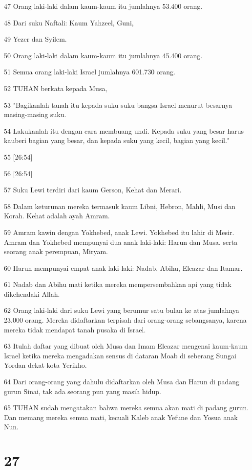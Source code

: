 \par 47 Orang laki-laki dalam kaum-kaum itu jumlahnya 53.400 orang.
\par 48 Dari suku Naftali: Kaum Yahzeel, Guni,
\par 49 Yezer dan Syilem.
\par 50 Orang laki-laki dalam kaum-kaum itu jumlahnya 45.400 orang.
\par 51 Semua orang laki-laki Israel jumlahnya 601.730 orang.
\par 52 TUHAN berkata kepada Musa,
\par 53 "Bagikanlah tanah itu kepada suku-suku bangsa Israel menurut besarnya masing-masing suku.
\par 54 Lakukanlah itu dengan cara membuang undi. Kepada suku yang besar harus kauberi bagian yang besar, dan kepada suku yang kecil, bagian yang kecil."
\par 55 [26:54]
\par 56 [26:54]
\par 57 Suku Lewi terdiri dari kaum Gerson, Kehat dan Merari.
\par 58 Dalam keturunan mereka termasuk kaum Libni, Hebron, Mahli, Musi dan Korah. Kehat adalah ayah Amram.
\par 59 Amram kawin dengan Yokhebed, anak Lewi. Yokhebed itu lahir di Mesir. Amram dan Yokhebed mempunyai dua anak laki-laki: Harun dan Musa, serta seorang anak perempuan, Miryam.
\par 60 Harun mempunyai empat anak laki-laki: Nadab, Abihu, Eleazar dan Itamar.
\par 61 Nadab dan Abihu mati ketika mereka mempersembahkan api yang tidak dikehendaki Allah.
\par 62 Orang laki-laki dari suku Lewi yang berumur satu bulan ke atas jumlahnya 23.000 orang. Mereka didaftarkan terpisah dari orang-orang sebangsanya, karena mereka tidak mendapat tanah pusaka di Israel.
\par 63 Itulah daftar yang dibuat oleh Musa dan Imam Eleazar mengenai kaum-kaum Israel ketika mereka mengadakan sensus di dataran Moab di seberang Sungai Yordan dekat kota Yerikho.
\par 64 Dari orang-orang yang dahulu didaftarkan oleh Musa dan Harun di padang gurun Sinai, tak ada seorang pun yang masih hidup.
\par 65 TUHAN sudah mengatakan bahwa mereka semua akan mati di padang gurun. Dan memang mereka semua mati, kecuali Kaleb anak Yefune dan Yosua anak Nun.

\chapter{27}


